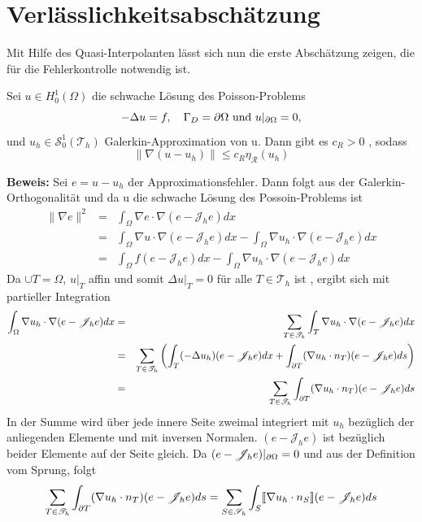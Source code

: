 \section{Verlässlichkeitsabschätzung}
Mit Hilfe des Quasi-Interpolanten lässt sich nun die erste Abschätzung zeigen, die für die Fehlerkontrolle notwendig ist.
\begin{theorem}[Verlässlichkeitsabschätzung]
	Sei $u\in H^1_0(\Omega)$ die schwache Lösung des Poisson-Problems \[-\Delta u = f ,\quad \Gamma_D = \partial \Omega \text{ und } u|_{\partial \Omega} = 0, \] und $u_h \in \mathscr{S}^1_0(\mathscr{T}_h)$ Galerkin-Approximation von u. Dann gibt es $c_R > 0$ , sodass
	\[\|\nabla(u-u_h)\|\leq c_R\eta_\mathscr{R}(u_h)
	\]
\end{theorem}
\textbf{Beweis:}
Sei $e = u-u_h$ der Approximationsfehler. Dann folgt aus der Galerkin-Orthogonalität und da u die schwache Lösung des Possoin-Problems ist
\begin{eqnarray*}
	\|\nabla e\|^2 &=& \int_{\Omega}\nabla e \cdot \nabla (e-\mathscr{J}_he)dx \\
	&=&\int_{\Omega} \nabla u \cdot \nabla (e-\mathscr{J}_he)dx -\int_{\Omega} \nabla u_h \cdot \nabla (e-\mathscr{J}_he)dx \\
	&=&\int_{\Omega} f (e-\mathscr{J}_he)dx -\int_{\Omega} \nabla u_h \cdot \nabla (e-\mathscr{J}_he)dx
\end{eqnarray*}
Da $\cup T = \Omega$,  $u|_T$ affin und somit $\Delta u|_T=0$ für alle $T\in\mathscr{T}_h$ ist , ergibt sich mit partieller Integration
\begin{eqnarray*}
	\int_{\Omega}\nabla u_h\cdot\nabla (e-\mathscr{J}_he) dx &=& \sum_{T\in\mathscr{T}_h} \int_{T} \nabla u_h \cdot \nabla (e-\mathscr{J}_he) dx \\
	&=& \sum_{T\in\mathscr{T}_h} \left(\int_{T} (-\Delta u_h) (e-\mathscr{J}_he) dx +\int_{\partial T} (\nabla u_h \cdot n_T) (e-\mathscr{J}_he) ds\right) \\
	&=&\sum_{T\in\mathscr{T}_h} \int_{\partial T} (\nabla u_h \cdot n_T) (e-\mathscr{J}_he) ds
\end{eqnarray*}
In der Summe wird über jede innere Seite zweimal integriert mit $u_h$ bezüglich der anliegenden Elemente und mit inversen Normalen. $(e-\mathscr{J}_he)$ ist bezüglich beider Elemente auf der Seite gleich. Da $(e-\mathscr{J}_he)|_{\partial \Omega}=0$ und aus der Definition vom Sprung, folgt
\[
\sum_{T\in\mathscr{T}_h} \int_{\partial T} (\nabla u_h \cdot n_T) (e-\mathscr{J}_he) ds =
\sum_{S\in\mathscr{S}_h} \int_{S} \llbracket \nabla u_h \cdot n_S\rrbracket (e-\mathscr{J}_he) ds
\]
